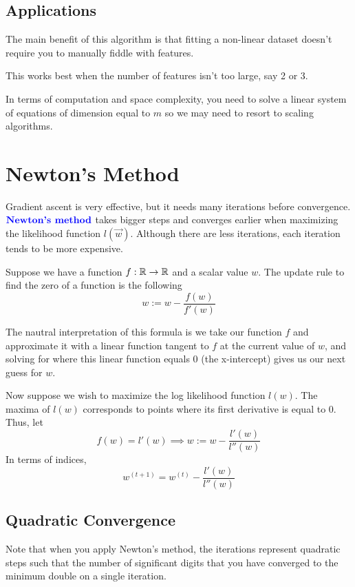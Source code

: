\documentclass[12pt]{scrartcl}
\begin{document}
\subsection{Applications}

The main benefit of this algorithm is that fitting a non-linear dataset doesn't require you to manually fiddle with features.

\begin{note}
    This works best when the number of features isn't too large, say 2 or 3.
\end{note}

In terms of computation and space complexity, you need to solve a linear system of equations of dimension equal to $m$ so we may need to resort to scaling algorithms.

\section{Newton's Method}

\begin{definition}
Gradient ascent is very effective, but it needs many iterations before
convergence. $\textbf{\color{blue} Newton's method}$ takes bigger steps
and converges earlier when maximizing the likelihood function
$l(\vec{w})$. Although there are less iterations, each
iteration tends to be more expensive.
\end{definition}

\begin{lemma}
    Suppose we have a function $f: \mathbb R \to \mathbb R$
    and a scalar value $w$. The update rule 
    to find the zero of a function is the following
    \[w := w - \frac{f(w)}{f'(w)}\]

    The nautral interpretation of this formula is 
    we take our function $f$ and approximate it with a linear
    function tangent to $f$ at the current value of 
    $w$, and solving for where this linear function 
    equals 0 (the x-intercept) gives us our next guess
    for $w$.
\end{lemma}

Now suppose we wish to maximize the log likelihood 
function $l(w)$. The maxima of $l(w)$ corresponds to points
where its first derivative is equal to 0. Thus, let 
\[f(w) = l'(w) \implies w := w - \frac{l'(w)}{l''(w)}\]
In terms of indices, 
\[w^{(t+1)} = w^{(t)} - \frac{l'(w)}{l''(w)}\]

\subsection{Quadratic Convergence}
Note that when you apply Newton's method,
the iterations represent quadratic steps 
such that the number of significant digits that
you have converged to the minimum double on a single 
iteration.
\end{document}
